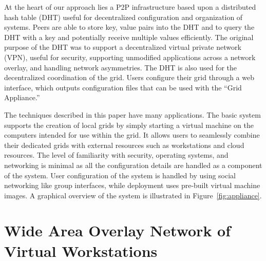 \documentclass[conference]{IEEEtran}
\begin{document}
At the heart of our approach lies a P2P infrastructure based upon a distributed
hash table (DHT) useful for decentralized configuration and organization of
systems.  Peers are able to store key, value pairs into the DHT and to query
the DHT with a key and potentially receive multiple values efficiently.  The
original purpose of the DHT was to support a decentralized virtual private
network (VPN), useful for security, supporting unmodified applications across a
network overlay, and handling network asymmetries.  The DHT is also used for
the decentralized coordination of the grid.  Users configure their grid through
a web interface, which outputs configuration files that can be used with the
``Grid Appliance.''

The techniques described in this paper have many applications.  The basic
system supports the creation of local grids by simply starting a virtual
machine on the computers intended for use within the grid.  It allows users to
seamlessly combine their dedicated grids with external resources such as
workstations and cloud resources.  The level of familiarity with security,
operating systems, and networking is minimal as all the configuration details
are handled as a component of the system.  User configuration of the system is
handled by using social networking like group interfaces, while deployment uses
pre-built virtual machine images.  A graphical overview of the system is
illustrated in Figure~\ref{fig:appliance}.


\section{Wide Area Overlay Network of Virtual Workstations}
\end{document}
